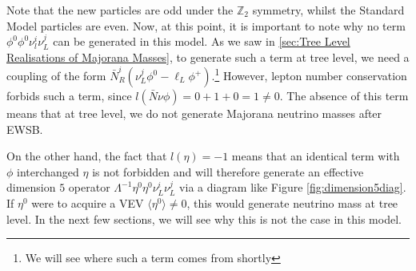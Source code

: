 \documentclass[10pt]{article}
\begin{document}
Note that the new particles are odd under the $\mathbb{Z}_2$ symmetry, whilst the Standard Model particles are even. Now, at this point, it is important to note why no term $\phi^0 \phi^0 \nu^i_l \nu^j_L$ can be generated in this model. As we saw in \ref{sec:Tree Level Realisations of Majorana Masses}, to generate such a term at tree level, we need a coupling of the form $\bar{N}^i_R(\nu^j_L \phi^0 - \ell_L \phi^+)$.\footnote{We will see where such a term comes from shortly} However, lepton number conservation forbids such a term, since $l(\bar{N}\nu\phi) = 0 + 1 + 0 = 1 \neq 0$. The absence of this term means that at tree level, we do not generate Majorana neutrino masses after EWSB.

On the other hand, the fact that $l(\eta) = -1$ means that an identical term with $\phi$ interchanged $\eta$ is not forbidden and will therefore generate an effective dimension $5$ operator $\Lambda^{-1}\eta^0 \eta^0 \nu^i_L \nu^j_L$ via a diagram like Figure \ref{fig:dimension5diag}. If $\eta^0$ were to acquire a VEV $\langle \eta^0 \rangle \neq 0$, this would generate neutrino mass at tree level. In the next few sections, we will see why this is not the case in this model.
\end{document}
